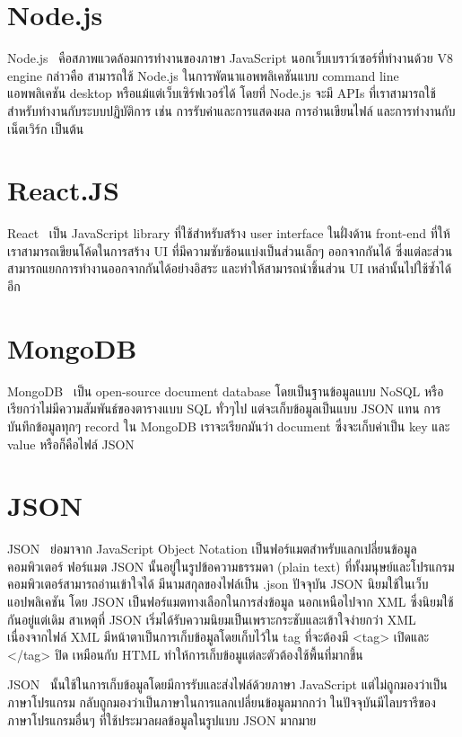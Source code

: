 \section{Node.js}
Node.js~\cite{NodeJS} คือสภาพแวดล้อมการทำงานของภาษา JavaScript นอกเว็บเบราว์เซอร์ที่ทำงานด้วย V8 engine กล่าวคือ สามารถใช้ Node.js ในการพัตนาแอพพลิเคชันแบบ command line แอพพลิเคชัน desktop หรือแม้แต่เว็บเซิร์ฟเวอร์ได้ 
โดยที่ Node.js จะมี APIs ที่เราสามารถใช้สำหรับทำงานกับระบบปฏิบัติการ เช่น การรับค่าและการแสดงผล การอ่านเขียนไฟล์ และการทำงานกับเน็ตเวิร์ก เป็นต้น

\section{React.JS}
React~\cite{ReactJS} เป็น JavaScript library ที่ใช้สำหรับสร้าง user interface ในฝั่งด้าน front-end ที่ให้เราสามารถเขียนโค้ดในการสร้าง UI ที่มีความซับซ้อนแบ่งเป็นส่วนเล็กๆ ออกจากกันได้ ซึ่งแต่ละส่วนสามารถแยกการทำงานออกจากกันได้อย่างอิสระ 
และทำให้สามารถนำชิ้นส่วน UI เหล่านั้นไปใช้ซ้ำได้อีก

\section{MongoDB}
MongoDB~\cite{MongoDB} เป็น open-source document database โดยเป็นฐานข้อมูลแบบ NoSQL หรือเรียกว่าไม่มีความสัมพันธ์ของตารางแบบ SQL ทั่วๆไป แต่จะเก็บข้อมูลเป็นแบบ JSON แทน การบันทึกข้อมูลทุกๆ record ใน MongoDB 
เราจะเรียกมันว่า document ซึ่งจะเก็บค่าเป็น key และ value หรือก็คือไฟล์ JSON

\section{JSON}
JSON~\cite{1_JSON} ย่อมาจาก JavaScript Object Notation เป็นฟอร์แมตสำหรับแลกเปลี่ยนข้อมูลคอมพิวเตอร์
ฟอร์แมต JSON นั้นอยู่ในรูปข้อความธรรมดา (plain text) ที่ทั้งมนุษย์และโปรแกรมคอมพิวเตอร์สามารถอ่านเข้าใจได้ 
มีนามสกุลของไฟล์เป็น .json ปัจจุบัน JSON นิยมใช้ในเว็บแอปพลิเคชัน โดย JSON เป็นฟอร์แมตทางเลือกในการส่งข้อมูล นอกเหนือไปจาก XML ซึ่งนิยมใช้กันอยู่แต่เดิม 
สาเหตุที่ JSON เริ่มได้รับความนิยมเป็นเพราะกระชับและเข้าใจง่ายกว่า XML เนื่องจากไฟล์ XML มีหน้าตาเป็นการเก็บข้อมูลโดยเก็บไว้ใน tag
ที่จะต้องมี <tag> เปิดและ </tag> ปิด เหมือนกับ HTML ทำให้การเก็บข้อมูแต่ละตัวต้องใช้พื้นที่มากขึ้น

JSON~\cite{2_JSON} นั้นใช้ในการเก็บข้อมูลโดยมีการรับและส่งไฟล์ด้วยภาษา JavaScript แต่ไม่ถูกมองว่าเป็นภาษาโปรแกรม กลับถูกมองว่าเป็นภาษาในการแลกเปลี่ยนข้อมูลมากกว่า 
ในปัจจุบันมีไลบรารีของภาษาโปรแกรมอื่นๆ ที่ใช้ประมวลผลข้อมูลในรูปแบบ JSON มากมาย

